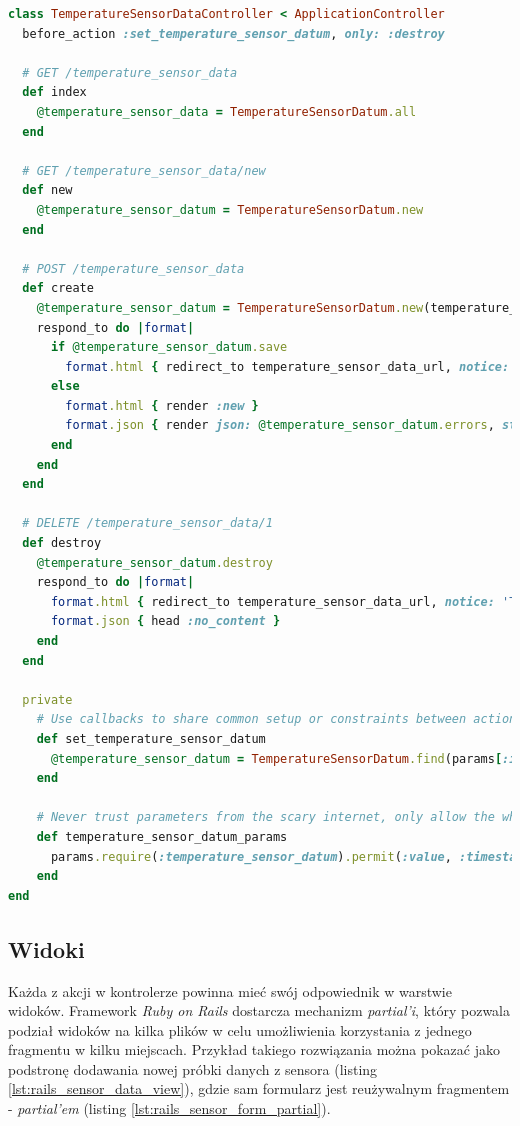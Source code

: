 \begin{lstlisting}[caption={TemperatureSensorDataController w Ruby on Rails.},label={lst:rails_temp_controller},language=Ruby]
class TemperatureSensorDataController < ApplicationController
  before_action :set_temperature_sensor_datum, only: :destroy

  # GET /temperature_sensor_data
  def index
    @temperature_sensor_data = TemperatureSensorDatum.all
  end

  # GET /temperature_sensor_data/new
  def new
    @temperature_sensor_datum = TemperatureSensorDatum.new
  end

  # POST /temperature_sensor_data
  def create
    @temperature_sensor_datum = TemperatureSensorDatum.new(temperature_sensor_datum_params)
    respond_to do |format|
      if @temperature_sensor_datum.save
        format.html { redirect_to temperature_sensor_data_url, notice: 'Temperature sensor datum was successfully created.' }
      else
        format.html { render :new }
        format.json { render json: @temperature_sensor_datum.errors, status: :unprocessable_entity }
      end
    end
  end

  # DELETE /temperature_sensor_data/1
  def destroy
    @temperature_sensor_datum.destroy
    respond_to do |format|
      format.html { redirect_to temperature_sensor_data_url, notice: 'Temperature sensor datum was successfully destroyed.' }
      format.json { head :no_content }
    end
  end

  private
    # Use callbacks to share common setup or constraints between actions.
    def set_temperature_sensor_datum
      @temperature_sensor_datum = TemperatureSensorDatum.find(params[:id])
    end

    # Never trust parameters from the scary internet, only allow the white list through.
    def temperature_sensor_datum_params
      params.require(:temperature_sensor_datum).permit(:value, :timestamp, :sensor_id)
    end
end
\end{lstlisting}

\subsection{Widoki}
Każda z akcji w kontrolerze powinna mieć swój odpowiednik w warstwie widoków. Framework \emph{Ruby on Rails} dostarcza mechanizm \emph{partial'i}, który pozwala podział widoków na kilka plików w celu umożliwienia korzystania z jednego fragmentu w kilku miejscach. Przykład takiego rozwiązania można pokazać jako podstronę dodawania nowej próbki danych z sensora (listing \ref{lst:rails_sensor_data_view}), gdzie sam formularz jest reużywalnym fragmentem - \emph{partial'em} (listing \ref{lst:rails_sensor_form_partial}).

